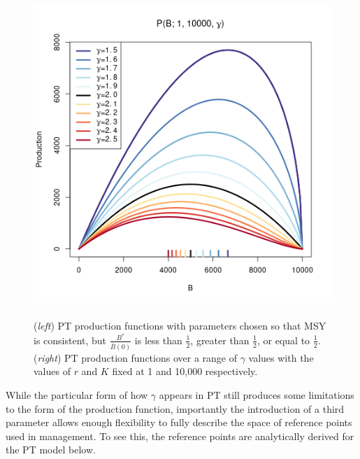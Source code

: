 \documentclass[12pt]{article}
\begin{document}
\begin{figure}[h!]
\begin{minipage}[h!]{0.349\textwidth}
\includegraphics[width=1.05\textwidth]{./plots/srr2.png}
\end{minipage}
\begin{minipage}[h!]{0.29\textwidth}
\hspace*{-0.5cm}
\vspace*{-0.75cm}
\caption{\label{srrPT}\\
	(\emph{left}) PT production functions with parameters chosen so that MSY is consistent, but $\frac{B^*}{\bar B(0)}$ is less than $\frac{1}{2}$, greater than $\frac{1}{2}$, or equal to $\frac{1}{2}$.
	(\emph{right}) PT production functions over a range of $\gamma$ values with the values of $r$ and $K$ fixed at 1 and 10,000 respectively.  
}
\end{minipage}
\end{figure}


%
\clearpage

%
While the particular form of how $\gamma$ appears in PT still produces some 
limitations to the form of the production function, importantly the 
introduction of a third parameter allows enough flexibility to fully describe 
the space of reference points used in management. To see this, the reference 
points are analytically derived for the PT model below. %

\end{document}
